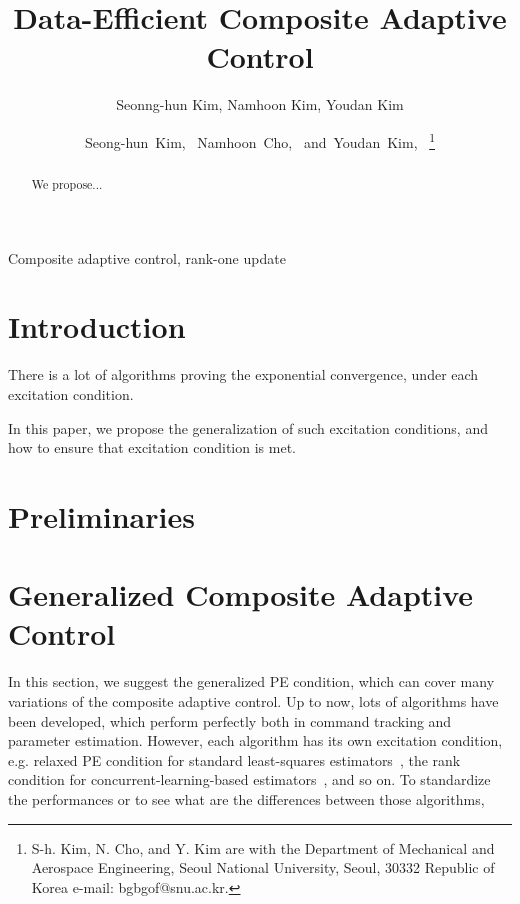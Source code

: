 \documentclass[]{IEEEtran}
\theoremstyle{definition}
\theoremstyle{remark}
\begin{document}
\title{Data-Efficient Composite Adaptive Control}
\author{Seonng-hun Kim, Namhoon Kim, Youdan Kim}
\author{Seong-hun~Kim,~
        Namhoon~Cho,~
        and~Youdan~Kim,~ %
\thanks{S-h. Kim, N. Cho, and Y. Kim are with the Department
of Mechanical and Aerospace Engineering, Seoul National University, Seoul,
30332 Republic of Korea e-mail: bgbgof@snu.ac.kr.}}
\maketitle



\begin{abstract}
	We propose...
\end{abstract}


\begin{IEEEkeywords}
	Composite adaptive control, rank-one update
\end{IEEEkeywords}


\section{Introduction}

There is a lot of algorithms proving the exponential convergence, under each
excitation condition.

In this paper, we propose the generalization of such excitation conditions, and
how to ensure that excitation condition is met.


\section{Preliminaries}


\section{Generalized Composite Adaptive Control}

In this section, we suggest the generalized PE condition, which can cover many
variations of the composite adaptive control. Up to now, lots of
algorithms have been developed, which perform perfectly both in command
tracking and parameter estimation. However, each algorithm has its own
excitation condition, e.g. relaxed PE condition for standard least-squares
estimators~\cite{slotine_applied_1991}, the rank condition for
concurrent-learning-based estimators~\cite{chowdhary_exponential_2014}, and so
on. To standardize the performances or to see what are the differences between
those algorithms, 
\end{document}
